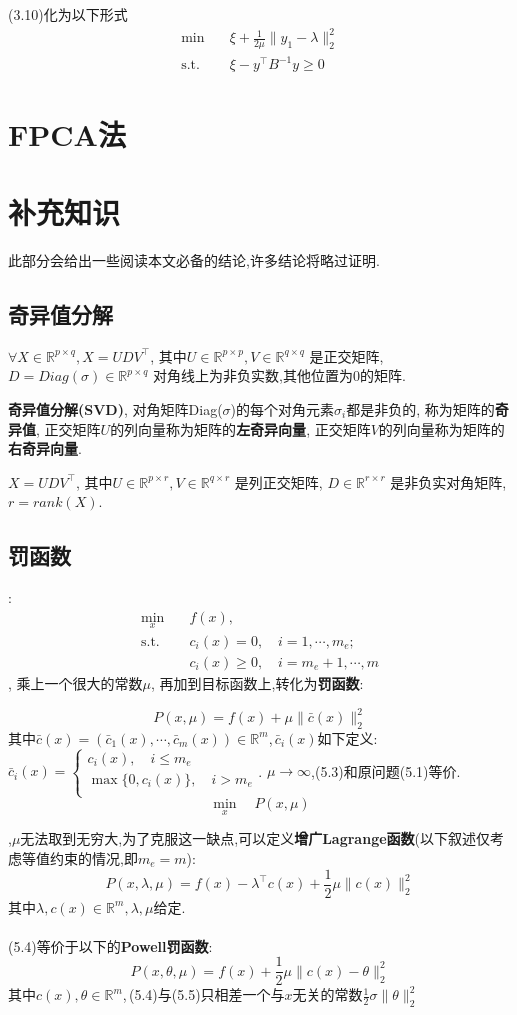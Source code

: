 \documentclass[UTF8]{ctexart}
\newcommand{\s}{\quad}
\renewcommand{\b}{\textbf}
\newcommand{\p}{\paragraph{}\s}
\newcommand{\sect}{\section}
\newcommand{\ssect}{\subsection}
\newcommand{\equSplit}[1]{\begin{equation}\begin{split}#1\end{split}\end{equation}}
\newcommand{\equ}[1]{\begin{equation}#1\end{equation}}
\newcommand{\Tst}{\text{s.t.}\s}
\newcommand{\norm}[1]{\lVert#1\rVert}
\newcommand{\Real}[1]{\mathbb{R}^{#1}}
\numberwithin{equation}{section}
\begin{document}
(3.10)化为以下形式
\equSplit{
	\min\s&\xi+\frac{1}{2\mu}\norm{y_1-\lambda}^2_2\\
	\Tst&\xi-y^\top B^{-1}y\geq0
}



\sect{FPCA法}

\sect{补充知识}
此部分会给出一些阅读本文必备的结论,许多结论将略过证明.
\ssect{奇异值分解}
$\forall X\in\Real{p\times q},X=UDV^\top$,
其中$U\in\Real{p\times p},V\in\Real{q\times q}$
是正交矩阵,
$D=Diag(\sigma)\in\Real{p\times q}$
对角线上为非负实数,其他位置为0的矩阵.

\b{奇异值分解(SVD)},
对角矩阵Diag($\sigma$)的每个对角元素$\sigma_i$都是非负的,
称为矩阵的\b{奇异值},
正交矩阵$U$的列向量称为矩阵的\b{左奇异向量},
正交矩阵$V$的列向量称为矩阵的\b{右奇异向量}.

$X=UDV^\top$,
其中$U\in\Real{p\times r},V\in\Real{q\times r}$
是列正交矩阵,
$D\in\Real{r\times r}$
是非负实对角矩阵,
$r=rank(X)$.

\ssect{罚函数}
:
\equSplit{
	\min_x\s&f(x),\\
	\Tst&c_i(x)=0,\s i=1,\cdots,m_e;\\
	&c_i(x)\geq 0,\s i=m_e+1,\cdots,m
}
,
乘上一个很大的常数$\mu$,
再加到目标函数上,转化为\b{罚函数}:

\equ{P(x,\mu)=f(x)+\mu \norm{\bar{c}(x)}^2_2}
其中$\bar{c}(x)=(\bar{c}_1(x),\cdots,\bar{c}_m(x))\in\Real{m}$,$\,\bar{c}_i(x)$如下定义:
$\bar{c}_i(x)=
\begin{cases}
	c_i(x),\s i\leq m_e       \\
	\max\{0,c_i(x)\},\s i>m_e \\
\end{cases}
$.
$\mu\rightarrow\infty$,(5.3)和原问题(5.1)等价.
\equ{\min_x\s P(x,\mu)}

,$\mu$无法取到无穷大,为了克服这一缺点,可以定义\b{增广Lagrange函数}(以下叙述仅考虑等值约束的情况,即$m_e=m$):
\equ{P(x,\lambda,\mu)=f(x)-\lambda^\top c(x)+\frac{1}{2}\mu\norm{c(x)}^2_2}
其中$\lambda,c(x)\in\Real{m},\lambda,\mu$给定.

\p(5.4)等价于以下的\b{Powell罚函数}:
\equ{P(x,\theta,\mu)=f(x)+\frac{1}{2}\mu\norm{c(x)-\theta}^2_2}
其中$c(x),\theta\in\Real{m}$,\,(5.4)与(5.5)只相差一个与$x$无关的常数$\frac{1}{2}\sigma\norm{\theta}^2_2$
\end{document}
